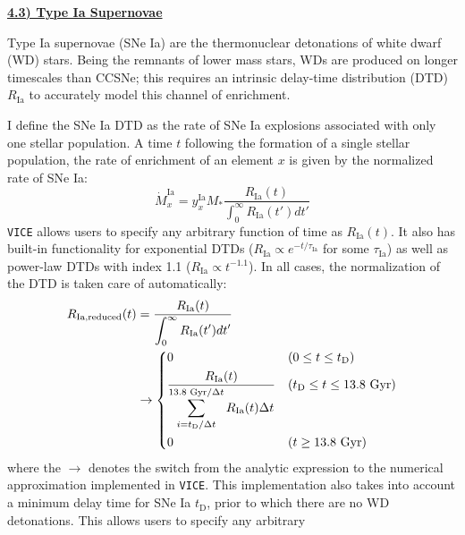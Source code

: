 \documentclass{report}
\newcommand\ddfrac[2]{\frac{\displaystyle #1}{\displaystyle #2}}
\begin{document}
\newpage
\noindent 
\begin{center} 
\hypertarget{enrichment:sneia}{
	\underline{\LARGE
		\textbf{4.3) Type Ia Supernovae} 
	}
}
\end{center}
\par\noindent 
Type Ia supernovae (SNe Ia) are the thermonuclear detonations of white dwarf 
(WD) stars. Being the remnants of lower mass stars, WDs are produced on longer 
timescales than CCSNe; this requires an intrinsic delay-time distribution (DTD) 
$R_\text{Ia}$ to accurately model this channel of enrichment. 
\par
I define the SNe Ia DTD as the rate of SNe Ia explosions associated with only 
one stellar population. A time $t$ following the formation of a single stellar 
population, the rate of enrichment of an element $x$ is given by the normalized 
rate of SNe Ia: 
\begin{equation}
\dot{M}_x^\text{Ia} = y_x^\text{Ia}M_* \ddfrac{
	R_\text{Ia}(t)
}{
	\int_0^\infty R_\text{Ia}(t')dt'
}
\end{equation}
\texttt{VICE} allows users to specify any arbitrary function of time as 
$R_\text{Ia}(t)$. It also has built-in functionality for exponential DTDs 
($R_\text{Ia} \propto e^{-t/\tau_\text{Ia}}$ for some $\tau_\text{Ia}$) as 
well as power-law DTDs with index 1.1 ($R_\text{Ia} \propto t^{-1.1}$). In 
all cases, the normalization of the DTD is taken care of automatically: 
\begin{equation}\begin{split}
R_\text{Ia,reduced}(t) &= \ddfrac{
	R_\text{Ia}(t)
}{
	\int_0^\infty R_\text{Ia}(t')dt'
} \\ 
&\rightarrow \begin{dcases} 
0 & (0 \leq t \leq t_\text{D}) \\ 
\ddfrac{
	R_\text{Ia}(t)
}{
	\sum_{i = t_\text{D}/\Delta t}^{13.8\text{ Gyr}/\Delta t} 
	R_\text{Ia}(t)\Delta t
} & (t_\text{D} \leq t \leq 13.8\text{ Gyr}) \\ 
0 & (t \geq 13.8\text{ Gyr})
\end{dcases}
\end{split}\end{equation}
where the $\rightarrow$ denotes the switch from the analytic expression to the 
numerical approximation implemented in \texttt{VICE}. This implementation also 
takes into account a minimum delay time for SNe Ia $t_\text{D}$, prior to 
which there are no WD detonations. This allows users to specify any arbitrary 
\end{document}
